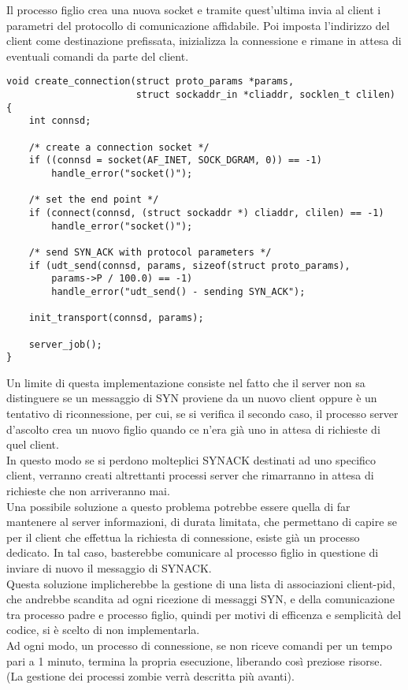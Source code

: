 Il processo figlio crea una nuova socket e tramite quest'ultima invia al client 
i parametri del protocollo di comunicazione affidabile.
Poi imposta l'indirizzo del client come destinazione prefissata, inizializza la 
connessione e rimane in attesa di eventuali comandi da parte del client.
\begin{lstlisting}[title=server.c]
void create_connection(struct proto_params *params,
					   struct sockaddr_in *cliaddr, socklen_t clilen)
{
	int connsd;

	/* create a connection socket */
	if ((connsd = socket(AF_INET, SOCK_DGRAM, 0)) == -1)
		handle_error("socket()");

	/* set the end point */
	if (connect(connsd, (struct sockaddr *) cliaddr, clilen) == -1)
		handle_error("socket()");

	/* send SYN_ACK with protocol parameters */
	if (udt_send(connsd, params, sizeof(struct proto_params), 
		params->P / 100.0) == -1)
		handle_error("udt_send() - sending SYN_ACK");

	init_transport(connsd, params);

	server_job();
}
\end{lstlisting}
Un limite di questa implementazione consiste nel fatto che il server non sa 
distinguere se un messaggio di SYN proviene da un nuovo client oppure è un 
tentativo di riconnessione, per cui, se si verifica il secondo caso, il 
processo server d'ascolto crea un nuovo figlio quando ce n'era già uno in 
attesa di richieste di quel client.\\
In questo modo se si perdono molteplici SYNACK destinati ad uno specifico 
client, verranno creati altrettanti processi server che rimarranno in attesa 
di richieste che non arriveranno mai.\\
Una possibile soluzione a questo problema potrebbe essere quella di far 
mantenere al server informazioni, di durata limitata, che permettano di capire
se per il client che effettua la richiesta di connessione, esiste già un 
processo dedicato. In tal caso, basterebbe comunicare al processo figlio in 
questione di inviare di nuovo il messaggio di SYNACK.\\
Questa soluzione implicherebbe la gestione di una lista di associazioni 
client-pid, che andrebbe scandita ad ogni ricezione di messaggi SYN, e della 
comunicazione tra processo padre e processo figlio, quindi per motivi di
efficenza e semplicità del codice, si è scelto di non implementarla.\\
Ad ogni modo, un processo di connessione, se non riceve comandi per un tempo 
pari a 1 minuto, termina la propria esecuzione, liberando così preziose risorse.\\
(La gestione dei processi zombie verrà descritta più avanti).
